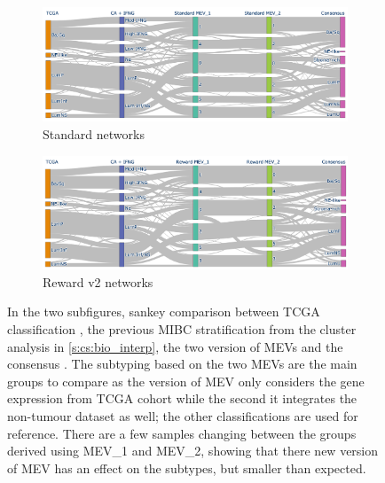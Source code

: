 \begin{figure}[!b]
    \centering
    \begin{subfigure}{1.0\linewidth}
        \includegraphics[width=1.0\textwidth,keepaspectratio]{Sections/Network_II/validation/mevs_comp_std.png}
        \caption{Standard networks}
    \end{subfigure} %
    \centering
    \begin{subfigure}{1.0\linewidth}
        \includegraphics[width=1.0\textwidth,keepaspectratio]{Sections/Network_II/validation/mevs_comp_rwd.png}
        \caption{Reward v2 networks}
    \end{subfigure}
    \centering
    \caption[Subtypes derived from MEV vs iMEV]{In the two subfigures, sankey comparison between TCGA classification \citep{Robertson2017-mg}, the previous MIBC stratification from the cluster analysis in \cref{s:cs:bio_interp}, the two version of MEVs and the consensus \citep{Kamoun2020-tj}. The subtyping based on the two MEVs are the main groups to compare as the version of MEV only considers the gene expression from TCGA cohort while the second it integrates the non-tumour dataset as well; the other classifications are used for reference. There are a few samples changing between the groups derived using MEV\_1 and MEV\_2, showing that there new version of MEV has an effect on the subtypes, but smaller than expected. }
    \label{fig:N_II:mevs_comp}
\end{figure}




